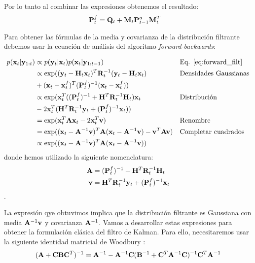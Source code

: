 Por lo tanto al combinar las expresiones obtenemos el resultado:
\begin{align*}
    \mathbf{P}_t^f &= \mathbf{Q}_t + \mathbf{M}_t \mathbf{P}_{t-1}^a \mathbf{M}_t^T
\end{align*}

Para obtener las fórmulas de la media y covarianza de la distribución filtrante debemos usar la ecuación de análisis del algoritmo \textit{forward-backwards}:

\begin{align*}
    p(\mathbf{x}_t | \mathbf{y}_{1:t}) &\propto p(\mathbf{y}_t | \mathbf{x}_t) p(\mathbf{x}_t | \mathbf{y}_{1:t-1}) && \text{Eq. \ref{eq:forward_filt}} \\
    &\propto \exp((\mathbf{y}_t - \mathbf{H}_t \mathbf{x}_t)^T \mathbf{R}_t^{-1} (\mathbf{y}_t - \mathbf{H}_t \mathbf{x}_t) && \text{Densidades Gaussianas}\\ 
    &+ (\mathbf{x}_t - \mathbf{x}_t^f)^T \mathbf{(}\mathbf{P}_t^{f})^{-1} (\mathbf{x}_t - \mathbf{x}_t^f)) \\
    &\propto \exp(\mathbf{x}_t^T (\mathbf{(}\mathbf{P}_t^f)^{-1} + \mathbf{H}^T \mathbf{R}_t^{-1} \mathbf{H}_t) \mathbf{x}_t && \text{Distribución}\\
    &- 2 \mathbf{x}_t^T (\mathbf{H}^T \mathbf{R}_t^{-1} \mathbf{y}_t + (\mathbf{P}_t^{f})^{-1} \mathbf{x}_t)) \\
    &= \exp(\mathbf{x}_t^T \mathbf{A} \mathbf{x}_t - 2\mathbf{x}_t^T \mathbf{v}) && \text{Renombre}\\
    &= \exp((\mathbf{x}_t - \mathbf{A}^{-1}\mathbf{v})^T \mathbf{A} (\mathbf{x}_t - \mathbf{A}^{-1}\mathbf{v}) - \mathbf{v}^T \mathbf{A} \mathbf{v}) && \text{Completar cuadrados}\\
    &\propto \exp((\mathbf{x}_t - \mathbf{A}^{-1}\mathbf{v})^T \mathbf{A} (\mathbf{x}_t - \mathbf{A}^{-1}\mathbf{v}))
\end{align*}
donde hemos utilizado la siguiente nomenclatura:
\begin{align*}
    \mathbf{A} &= \mathbf{(}\mathbf{P}_t^f)^{-1} + \mathbf{H}^T \mathbf{R}_t^{-1} \mathbf{H}_t \\
    \mathbf{v} &= \mathbf{H}^T \mathbf{R}_t^{-1} \mathbf{y}_t + (\mathbf{P}_t^{f})^{-1} \mathbf{x}_t
\end{align*}.

La expresión qye obtuvimos implica que la distribución filtrante es Gaussiana con media $\mathbf{A}^{-1}\mathbf{v}$ y covarianza $\mathbf{A}^{-1}$. Vamos a desarrollar estas expresiones para obtener la formulación clásica del filtro de Kalman. Para ello, necesitaremos usar la siguiente identidad matricial de Woodbury \citep{Golub1996}:
\begin{align*}
    (\mathbf{A} + \mathbf{C} \mathbf{B} \mathbf{C}^T)^{-1} = \mathbf{A}^{-1} - \mathbf{A}^{-1} \mathbf{C} (\mathbf{B}^{-1} + \mathbf{C}^T \mathbf{A}^{-1} \mathbf{C})^{-1} \mathbf{C}^T \mathbf{A}^{-1}
\end{align*}

